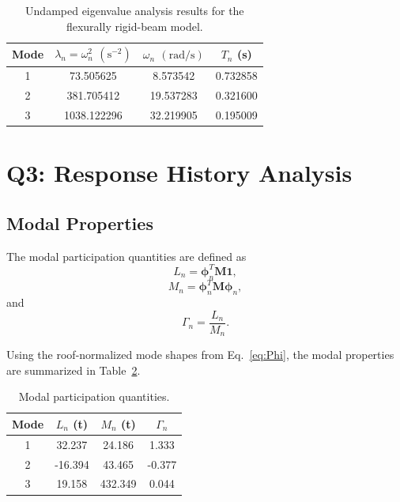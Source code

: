 \documentclass[11pt,a4paper]{article}
\begin{document}
\begin{table}[H]
\centering
\caption{Undamped eigenvalue analysis results for the flexurally rigid-beam model.}
\begin{tabular}{cccc}
\toprule
Mode & $\lambda_n=\omega_n^2$ $(\mathrm{s^{-2}})$ & $\omega_n$ $(\mathrm{rad/s})$ & $T_n$ (s)\\
\midrule
1 & 73.505625 & 8.573542 & 0.732858\\
2 & 381.705412 & 19.537283 & 0.321600\\
3 & 1038.122296 & 32.219905 & 0.195009\\
\bottomrule
\end{tabular}
\label{tab:q2_eigenvalues}
\end{table}
\pagebreak
\section{Q3: Response History Analysis}

\subsection{Modal Properties}
The modal participation quantities are defined as
\begin{equation}
L_n=\bm{\phi}_n^T\bm{M}\bm{1},
\end{equation}
\begin{equation}
M_n=\bm{\phi}_n^T\bm{M}\bm{\phi}_n,
\end{equation}
and
\begin{equation}
\Gamma_n=\frac{L_n}{M_n}.
\end{equation}

Using the roof-normalized mode shapes from Eq.~\eqref{eq:Phi}, the modal properties are summarized in Table~\ref{tab:q3_modal_properties}.

\begin{table}[H]
\centering
\caption{Modal participation quantities.}
\begin{tabular}{cccc}
\toprule
Mode & $L_n$ (t) & $M_n$ (t) & $\Gamma_n$\\
\midrule
1 & 32.237 & 24.186 & 1.333\\
2 & -16.394 & 43.465 & -0.377\\
3 & 19.158 & 432.349 & 0.044\\
\bottomrule
\end{tabular}
\label{tab:q3_modal_properties}
\end{table}
\end{document}
